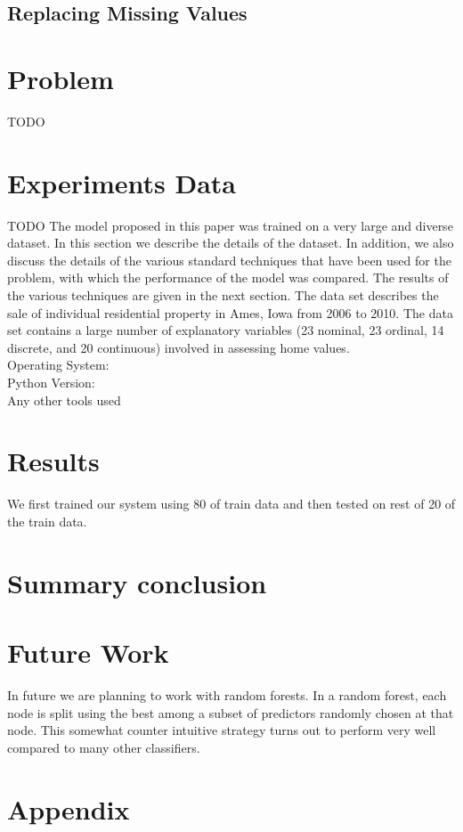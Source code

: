 \documentclass[fleqn,10pt]{SelfArx} %
\begin{document}
	\subsection{Replacing Missing Values}
	

	\section{Problem}
	TODO
	
	
	\section{Experiments Data}
	TODO
	The model proposed in this paper was trained on a very
	large and diverse dataset. In this section we describe the
	details of the dataset. In addition, we also discuss the details
	of the various standard techniques that have been used for
	the problem, with which the performance of the model was
	compared. The results of the various techniques are given
	in the next section. The data set describes the sale of individual residential property in Ames, Iowa from 2006 to 2010. The data set contains a large number of explanatory variables (23 nominal, 23 ordinal, 14 discrete, and 20 continuous) involved in assessing home
	values.\\
	Operating System: \\
	Python Version: \\
	Any other tools used \\
	
	
	
	
	\section{Results}
	We first trained our system using 80 of train data and then tested on rest of 20 of the train data. 
	\section{Summary conclusion}
	\section{Future Work}
	In future we are planning to work with random forests. In a random forest, each node is split using the best among a subset of predictors randomly chosen at that node. This somewhat counter intuitive strategy turns out to perform very well compared to many other classifiers.
	\section{Appendix}
\end{document}
